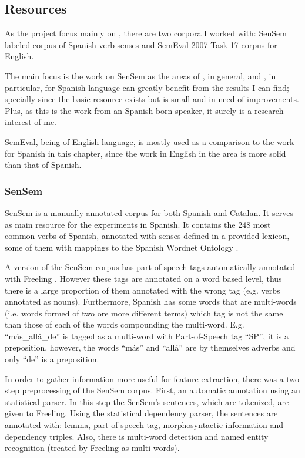 \subsection{Resources}\label{sec:supervised:resources}

As the project focus mainly on \vsd, there are two corpora I worked with:
SenSem \cite{alonso-etal-07-sensem} labeled corpus of Spanish verb senses and
SemEval-2007 Task 17 \cite{Pradhan:2007:STE:1621474.1621490} corpus for
English.

The main focus is the work on SenSem as the areas of \wsd, in general, and
\vsd, in particular, for Spanish language can greatly benefit from the results
I can find; specially since the basic resource exists but is small and in
need of improvements. Plus, as this is the work from an Spanish born speaker,
it surely is a research interest of me.

SemEval, being of English language, is mostly used as a comparison to the work
for Spanish in this chapter, since the work in English in the area is more
solid than that of Spanish.

\subsubsection{SenSem}\label{sec:supervised:sensem}

SenSem \cite{alonso-etal-07-sensem} is a manually annotated corpus for both
Spanish and Catalan. It serves as main resource for the experiments in Spanish.
It contains the 248 most common verbs of Spanish, annotated with senses defined
in a provided lexicon, some of them with mappings to the Spanish Wordnet
Ontology \cite{DBLP:conf/konvens/MontravetaVF08}.

A version of the SenSem corpus has part-of-speech tags automatically annotated
with Freeling \cite{padro12}. However these tags are annotated on a word based
level, thus there is a large proportion of them annotated with the wrong tag
(e.g. verbs annotated as nouns). Furthermore, Spanish has some words that are
multi-words (i.e. words formed of two ore more different terms) which tag is
not the same than those of each of the words compounding the multi-word. E.g.
``m\'as\_all\'a\_de'' is tagged as a multi-word with Part-of-Speech tag ``SP'',
it is a preposition, however, the words ``m\'as'' and ``all\'a'' are by
themselves adverbs and only ``de'' is a preposition.

In order to gather information more useful for feature extraction, there was a
two step preprocessing of the SenSem corpus. First, an automatic annotation
using an statistical parser. In this step the SenSem's sentences, which are
tokenized, are given to Freeling. Using the statistical dependency parser, the
sentences are annotated with: lemma, part-of-speech tag, morphosyntactic
information and dependency triples. Also, there is multi-word detection and
named entity recognition (treated by Freeling as multi-words).

